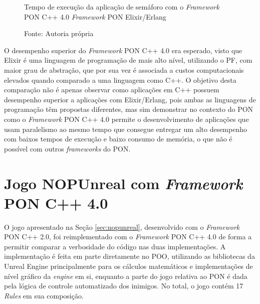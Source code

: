 \begin{figure}[!htb]
\centering
{}
\caption{Tempo de execução da aplicação de semáforo com o \textit{Framework}
PON C++ 4.0 \textit{Framework} PON Elixir/Erlang}
\caption*{Fonte: Autoria própria}
\label{fig:fw4_elixir}
\end{figure}

O desempenho superior do \textit{Framework} PON C++ 4.0 era esperado, visto que
Elixir é uma linguagem de programação de mais alto nível, utilizando o PF, com
maior grau de abstração, que por sua vez é associada a custos computacionais
elevados quando comparado a uma linguagem como C++. O objetivo desta comparação
não é apenas observar como aplicações em C++ possuem desempenho superior a
aplicações com Elixir/Erlang, pois ambas as linguagens de programação têm
propostas diferentes, mas sim demonstrar no contexto do PON como o
\textit{Framework} PON C++ 4.0 permite o desenvolvimento de aplicações que usam
paralelismo ao mesmo tempo que consegue entregar um alto desempenho com baixos
tempos de execução e baixo consumo de memória, o que não é possível com outros
\textit{frameworks} do PON.

\section{Jogo NOPUnreal com \textit{Framework} PON C++
4.0}\label{sec:nopunreal4}

O jogo apresentado na Seção \ref{sec:nopunreal}, desenvolvido com o
\textit{Framework} PON C++ 2.0, foi reimplementado com o \textit{Framework} PON
C++ 4.0 de forma a permitir comparar a verbosidade do código nas duas
implementações. A implementação é feita em parte diretamente no POO, utilizando
as bibliotecas da Unreal Engine principalmente para os cálculos matemáticos e
implementações de nível gráfico da \textit{engine} em si, enquanto a parte do
jogo relativa ao PON é dada pela lógica de controle automatizado dos inimigos.
No total, o jogo contém 17 \textit{Rules} em sua composição.


